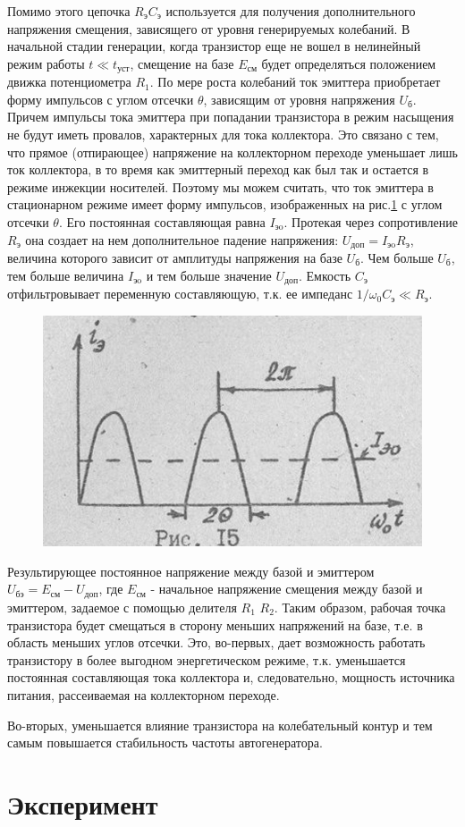 Помимо этого цепочка $R_\text{э}C_\text{э}$ используется для получения дополнительного напряжения смещения, зависящего от уровня генерируемых колебаний. В начальной стадии генерации, когда транзистор еще не вошел в нелинейный режим работы $t\ll t_\text{уст}$, смещение на базе $E_\text{см}$ будет определяться положением движка потенциометра $R_1$. По мере роста колебаний ток эмиттера приобретает форму импульсов с углом отсечки $\theta$, зависящим от уровня напряжения $U_\text{б}$. Причем импульсы тока эмиттера при попадании транзистора в режим насыщения не будут иметь провалов, характерных для тока коллектора. Это связано с тем, что прямое (отпирающее) напряжение на коллекторном переходе уменьшает лишь ток коллектора, в то время как эмиттерный переход как был так и остается в режиме инжекции носителей. Поэтому мы можем считать, что ток эмиттера в стационарном режиме имеет форму импульсов, изображенных на рис.\ref{fig:fig15} с углом отсечки $\theta$. Его постоянная составляющая равна $I_{\text{эo}}$. Протекая через сопротивление $R_\text{э}$ она создает на нем дополнительное падение напряжения: $U_\text{доп}=I_{\text{эo}}R_\text{э}$, величина которого зависит от амплитуды напряжения на базе $U_\text{б}$. Чем больше $U_\text{б}$, тем больше величина $I_{\text{эo}}$ и тем больше значение $U_\text{доп}$. Емкость $C_\text{э}$ отфильтровывает переменную составляющую, т.к. ее импеданс $1/\omega_0 C_\text{э}\ll R_\text{э}$.

\begin{figure}
\includegraphics[width=\linewidth]{circuit/15.jpg}
\caption{}
\label{fig:fig15}
\vspace{-20pt}
\end{figure}

Результирующее постоянное напряжение между базой и эмиттером $U_\text{бэ}=E_\text{см}-U_\text{доп}$, где $E_\text{см}$ - начальное напряжение смещения между базой и эмиттером, задаемое с помощью делителя $R_1$ \textdiv $R_2$. Таким образом, рабочая точка транзистора будет смещаться в сторону меньших напряжений на базе, т.е. в область меньших углов отсечки. Это, во-первых, дает возможность работать транзистору в более выгодном энергетическом режиме, т.к. уменьшается постоянная составляющая тока коллектора и, следовательно, мощность источника питания, рассеиваемая на коллекторном переходе.

Во-вторых, уменьшается влияние транзистора на колебательный контур и тем самым повышается стабильность частоты автогенератора.
\section{Эксперимент}
